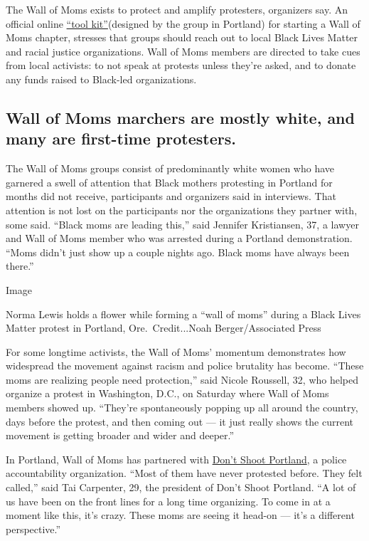 The Wall of Moms exists to protect and amplify protesters, organizers
say. An official online
\href{https://thewallofmoms.com/wall-of-mom-chapters}{``tool
kit''}(designed by the group in Portland) for starting a Wall of Moms
chapter, stresses that groups should reach out to local Black Lives
Matter and racial justice organizations. Wall of Moms members are
directed to take cues from local activists: to not speak at protests
unless they're asked, and to donate any funds raised to Black-led
organizations.

\hypertarget{wall-of-moms-marchers-are-mostly-white-and-many-are-first-time-protesters}{%
\subsection{Wall of Moms marchers are mostly white, and many are
first-time
protesters.}\label{wall-of-moms-marchers-are-mostly-white-and-many-are-first-time-protesters}}

The Wall of Moms groups consist of predominantly white women who have
garnered a swell of attention that Black mothers protesting in Portland
for months did not receive, participants and organizers said in
interviews. That attention is not lost on the participants nor the
organizations they partner with, some said. ``Black moms are leading
this,'' said Jennifer Kristiansen, 37, a lawyer and Wall of Moms member
who was arrested during a Portland demonstration. ``Moms didn't just
show up a couple nights ago. Black moms have always been there.''

Image

Norma Lewis holds a flower while forming a ``wall of moms'' during a
Black Lives Matter protest in Portland, Ore.~Credit...Noah
Berger/Associated Press

For some longtime activists, the Wall of Moms' momentum demonstrates how
widespread the movement against racism and police brutality has become.
``These moms are realizing people need protection,'' said Nicole
Roussell, 32, who helped organize a protest in Washington, D.C., on
Saturday where Wall of Moms members showed up. ``They're spontaneously
popping up all around the country, days before the protest, and then
coming out --- it just really shows the current movement is getting
broader and wider and deeper.''

In Portland, Wall of Moms has partnered with
\href{https://www.dontshootpdx.org/}{Don't Shoot Portland}, a police
accountability organization. ``Most of them have never protested before.
They felt called,'' said Tai Carpenter, 29, the president of Don't Shoot
Portland. ``A lot of us have been on the front lines for a long time
organizing. To come in at a moment like this, it's crazy. These moms are
seeing it head-on --- it's a different perspective.''


